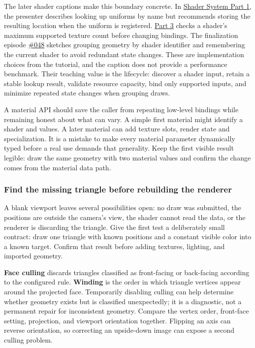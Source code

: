 The later shader captions make this boundary concrete. In \href{https://www.youtube.com/watch?v=wXLsGqck100}{Shader System Part 1}, the presenter describes looking up uniforms by name but recommends storing the resulting location when the uniform is registered. \href{https://www.youtube.com/watch?v=4E0v_5Wva-8}{Part 3} checks a shader's maximum supported texture count before changing bindings. The finalization episode \href{https://www.youtube.com/watch?v=9nP3aBsrCXs}{\#048} sketches grouping geometry by shader identifier and remembering the current shader to avoid redundant state changes. These are implementation choices from the tutorial, and the caption does not provide a performance benchmark. Their teaching value is the lifecycle: discover a shader input, retain a stable lookup result, validate resource capacity, bind only supported inputs, and minimize repeated state changes when grouping draws.

A material API should save the caller from repeating low-level bindings while remaining honest about what can vary. A simple first material might identify a shader and values. A later material can add texture slots, render state and specialization. It is a mistake to make every material parameter dynamically typed before a real use demands that generality. Keep the first visible result legible: draw the same geometry with two material values and confirm the change comes from the material data path.

\subsubsection{Find the missing triangle before rebuilding the renderer}\label{06-engine-ii-ch026-find-the-missing-triangle-before-rebuilding-the-renderer}

\hypertarget{06-engine-ii-ch026-find-the-missing-triangle-before-rebuilding-the-renderer}{}

A blank viewport leaves several possibilities open: no draw was submitted, the positions are outside the camera's view, the shader cannot read the data, or the renderer is discarding the triangle. Give the first test a deliberately small contract: draw one triangle with known positions and a constant visible color into a known target. Confirm that result before adding textures, lighting, and imported geometry.

\textbf{Face culling} discards triangles classified as front-facing or back-facing according to the configured rule. \textbf{Winding} is the order in which triangle vertices appear around the projected face. Temporarily disabling culling can help determine whether geometry exists but is classified unexpectedly; it is a diagnostic, not a permanent repair for inconsistent geometry. Compare the vertex order, front-face setting, projection, and viewport orientation together. Flipping an axis can reverse orientation, so correcting an upside-down image can expose a second culling problem.

